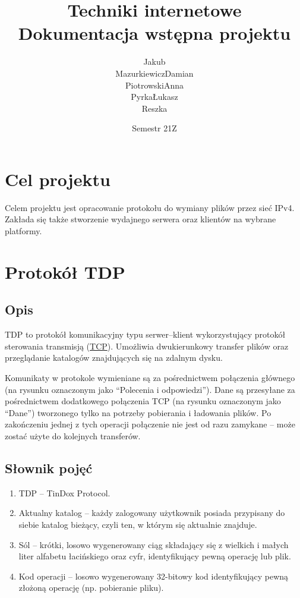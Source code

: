 \documentclass[10pt,a4paper]{article}
\title{Techniki internetowe \\ \large Dokumentacja wstępna projektu \quotes{TinDox}}
\author{
    \begin{tabular}{p{6em}p{6em}p{6em}p{6em}}
        \makecell{Jakub \\ Mazurkiewicz} &
        \makecell{Damian \\ Piotrowski} &
        \makecell{Anna \\ Pyrka} &
        \makecell{Łukasz \\ Reszka}
    \end{tabular}
}
\date{Semestr 21Z}
\newcommand{\quotes}[1]{``#1''}
\begin{document}
\maketitle
\tableofcontents
\pagebreak

\section{Cel projektu}
Celem projektu jest opracowanie protokołu do wymiany plików przez sieć IPv4. Zakłada się także stworzenie wydajnego serwera oraz klientów na wybrane platformy.

\section{Protokół TDP}

\subsection{Opis}
TDP to protokół komunikacyjny typu serwer--klient wykorzystujący protokół sterowania transmisją (\href{https://en.wikipedia.org/wiki/Transmission_Control_Protocol}{TCP}). Umożliwia dwukierunkowy transfer plików oraz przeglądanie katalogów znajdujących się na zdalnym dysku.

Komunikaty w protokole wymieniane są za pośrednictwem połączenia głównego (na rysunku oznaczonym jako \quotes{Polecenia i odpowiedzi}). Dane są przesyłane za pośrednictwem dodatkowego połączenia TCP (na rysunku oznaczonym jako \quotes{Dane}) tworzonego tylko na potrzeby pobierania i ładowania plików. Po zakończeniu jednej z tych operacji połączenie nie jest od razu zamykane -- może zostać użyte do kolejnych transferów.

\subsection{Słownik pojęć}
\begin{enumerate}
    \item TDP -- TinDox Protocol.
    \item Aktualny katalog -- każdy zalogowany użytkownik posiada przypisany do siebie katalog bieżący, czyli ten, w którym się aktualnie znajduje.
    \item Sól -- krótki, losowo wygenerowany ciąg składający się z wielkich i małych liter alfabetu łacińskiego oraz cyfr, identyfikujący pewną operację lub plik.
    \item Kod operacji -- losowo wygenerowany 32-bitowy kod identyfikujący pewną złożoną operację (np. pobieranie pliku).
\end{enumerate}
\end{document}
